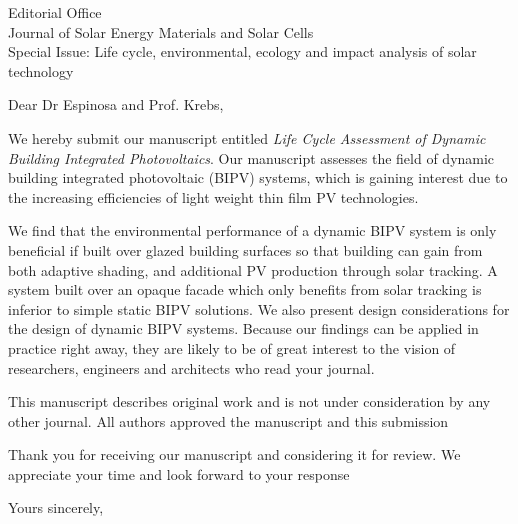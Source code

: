 \documentclass[a4paper,12pt]{letter}
\begin{document}
\begin{letter}{Editorial Office \\ Journal of Solar Energy Materials and Solar Cells\\ Special Issue: Life cycle, environmental, ecology and impact analysis of solar technology}
	\opening{Dear Dr Espinosa and Prof. Krebs,}
	We hereby submit our manuscript entitled \emph{Life Cycle Assessment of Dynamic Building Integrated Photovoltaics}. 
	Our manuscript assesses the field of dynamic building integrated photovoltaic (BIPV) systems, which is gaining interest due to the increasing efficiencies of light weight thin film PV technologies. 




	We find that the environmental performance of a dynamic BIPV system is only beneficial if built over glazed building surfaces so that building can gain from both adaptive shading, and additional PV production through solar tracking. A system built over an opaque facade which only benefits from solar tracking is inferior to simple static BIPV solutions. We also present design considerations for the design of dynamic BIPV systems.
	Because our findings can be applied in practice right away, they are likely to be of great interest to the vision of researchers, engineers and architects who read your journal. 




	This manuscript describes original work and is not under consideration by any other journal. All authors approved the manuscript and this submission




	Thank you for receiving our manuscript and considering it for review. We appreciate your time and look forward to your response

	\signature{Prageeth Jayathissa}
	\closing{Yours sincerely,}
\end{letter}

	
\end{document}
